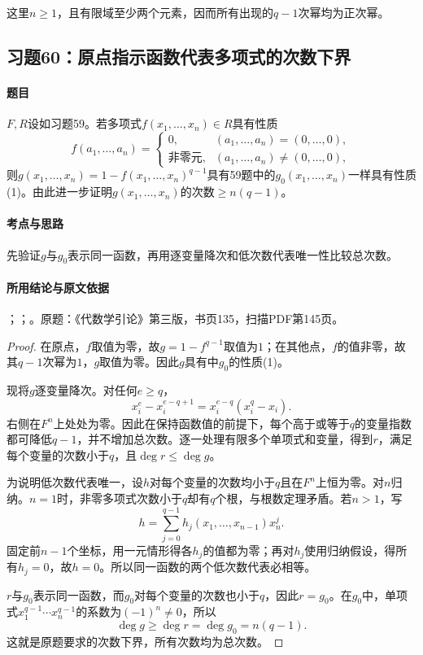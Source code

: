 这里$n\ge1$，且有限域至少两个元素，因而所有出现的$q-1$次幂均为正次幂。



\subsection{习题60：原点指示函数代表多项式的次数下界}

\label{ex:3:60}

\paragraph{题目}

$F,R$设如习题59。若多项式$f(x_1,\ldots,x_n)\in R$具有性质
\[
f(a_1,\ldots,a_n)=\begin{cases}
0,&(a_1,\ldots,a_n)=(0,\ldots,0),\\
\text{非零元},&(a_1,\ldots,a_n)\ne(0,\ldots,0),
\end{cases}
\]
则$g(x_1,\ldots,x_n)=1-f(x_1,\ldots,x_n)^{q-1}$具有59题中的$g_0(x_1,\ldots,x_n)$一样具有性质(1)。由此进一步证明$g(x_1,\ldots,x_n)$的次数$\ge n(q-1)$。

\paragraph{考点与思路}

先验证$g$与$g_0$表示同一函数，再用逐变量降次和低次数代表唯一性比较总次数。

\paragraph{所用结论与原文依据}

；；。原题：《代数学引论》第三版，书页135，扫描PDF第145页。


\begin{proof}

在原点，$f$取值为零，故$g=1-f^{q-1}$取值为$1$；在其他点，$f$的值非零，故其$q-1$次幂为$1$，$g$取值为零。因此$g$具有中$g_0$的性质(1)。

现将$g$逐变量降次。对任何$e\ge q$，
\[
x_i^e-x_i^{e-q+1}=x_i^{e-q}(x_i^q-x_i).
\]
右侧在$F^n$上处处为零。因此在保持函数值的前提下，每个高于或等于$q$的变量指数都可降低$q-1$，并不增加总次数。逐一处理有限多个单项式和变量，得到$r$，满足每个变量的次数小于$q$，且$\deg r\le\deg g$。

为说明低次数代表唯一，设$h$对每个变量的次数均小于$q$且在$F^n$上恒为零。对$n$归纳。$n=1$时，非零多项式次数小于$q$却有$q$个根，与根数定理矛盾。若$n>1$，写
\[
h=\sum_{j=0}^{q-1}h_j(x_1,\ldots,x_{n-1})x_n^j.
\]
固定前$n-1$个坐标，用一元情形得各$h_j$的值都为零；再对$h_j$使用归纳假设，得所有$h_j=0$，故$h=0$。所以同一函数的两个低次数代表必相等。

$r$与$g_0$表示同一函数，而$g_0$对每个变量的次数也小于$q$，因此$r=g_0$。在$g_0$中，单项式$x_1^{q-1}\cdots x_n^{q-1}$的系数为$(-1)^n\ne0$，所以
\[
\boxed{\deg g\ge\deg r=\deg g_0=n(q-1).}
\]
这就是原题要求的次数下界，所有次数均为总次数。

\end{proof}

